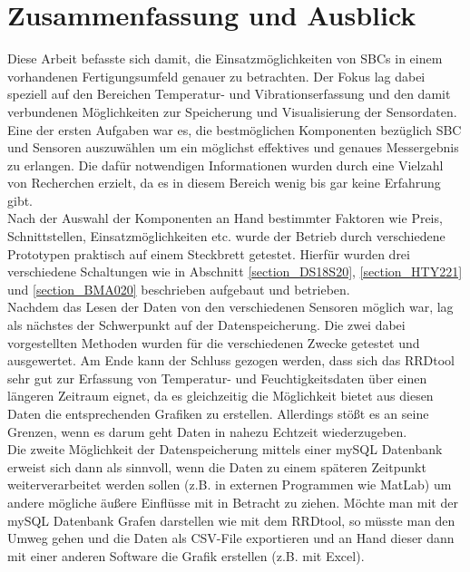 \chapter{Zusammenfassung und Ausblick}
\label{chapter Zusammenfassung und Ausblick}
Diese Arbeit befasste sich damit, die Einsatzmöglichkeiten von SBCs in einem vorhandenen Fertigungsumfeld genauer zu betrachten. Der Fokus lag dabei speziell auf den Bereichen Temperatur- und Vibrationserfassung und den damit verbundenen Möglichkeiten zur Speicherung und Visualisierung der Sensordaten. Eine der ersten Aufgaben war es, die bestmöglichen Komponenten bezüglich SBC und Sensoren auszuwählen um ein möglichst effektives und genaues Messergebnis zu erlangen. Die dafür notwendigen Informationen wurden durch eine Vielzahl von Recherchen erzielt, da es in diesem Bereich wenig bis gar keine Erfahrung gibt.\\
Nach der Auswahl der Komponenten an Hand bestimmter Faktoren wie Preis, Schnittstellen, Einsatzmöglichkeiten etc. wurde der Betrieb durch verschiedene Prototypen praktisch auf einem Steckbrett getestet. Hierfür wurden drei verschiedene Schaltungen wie in Abschnitt \ref{section_DS18S20}, \ref{section_HTY221} und \ref{section_BMA020} beschrieben aufgebaut und betrieben.\\

Nachdem das Lesen der Daten von den verschiedenen Sensoren möglich war, lag als nächstes der Schwerpunkt auf der Datenspeicherung. Die zwei dabei vorgestellten Methoden wurden für die verschiedenen Zwecke getestet und ausgewertet. Am Ende kann der Schluss gezogen werden, dass sich das RRDtool sehr gut zur Erfassung von Temperatur- und Feuchtigkeitsdaten über einen längeren Zeitraum eignet, da es gleichzeitig die Möglichkeit bietet aus diesen Daten die entsprechenden Grafiken zu erstellen. Allerdings stößt es an seine Grenzen, wenn es darum geht Daten in nahezu Echtzeit wiederzugeben. 
\\

Die zweite Möglichkeit der Datenspeicherung mittels einer mySQL Datenbank erweist sich dann als sinnvoll, wenn die Daten zu einem späteren Zeitpunkt weiterverarbeitet werden sollen (z.B. in externen Programmen wie MatLab) um andere mögliche äußere Einflüsse mit in Betracht zu ziehen. Möchte man mit der mySQL Datenbank Grafen darstellen wie mit dem RRDtool, so müsste man den Umweg gehen und die Daten als CSV-File exportieren und an Hand dieser dann mit einer anderen Software die Grafik erstellen (z.B. mit Excel).\\

